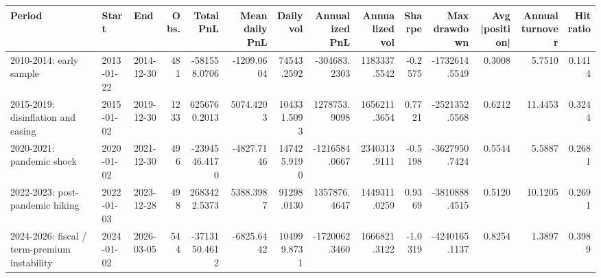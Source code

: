 \begin{tabular}{lllrrrrrrrrrrr}
\toprule
Period & Start & End & Obs. & Total PnL & Mean daily PnL & Daily vol & Annualized PnL & Annualized vol & Sharpe & Max drawdown & Avg |position| & Annual turnover & Hit ratio \\
\midrule
2010-2014: early sample & 2013-01-22 & 2014-12-30 & 481 & -581558.0706 & -1209.0604 & 74543.2592 & -304683.2303 & 1183337.5542 & -0.2575 & -1732614.5549 & 0.3008 & 5.7510 & 0.1414 \\
2015-2019: disinflation and easing & 2015-01-02 & 2019-12-30 & 1233 & 6256760.2013 & 5074.4203 & 104331.5093 & 1278753.9098 & 1656211.3654 & 0.7721 & -2521352.5568 & 0.6212 & 11.4453 & 0.3244 \\
2020-2021: pandemic shock & 2020-01-02 & 2021-12-30 & 496 & -2394546.4170 & -4827.7146 & 147425.9190 & -1216584.0667 & 2340313.9111 & -0.5198 & -3627950.7424 & 0.5544 & 5.5887 & 0.2681 \\
2022-2023: post-pandemic hiking & 2022-01-03 & 2023-12-28 & 498 & 2683422.5373 & 5388.3987 & 91298.0130 & 1357876.4647 & 1449311.0259 & 0.9369 & -3810888.4515 & 0.5120 & 10.1205 & 0.2691 \\
2024-2026: fiscal / term-premium instability & 2024-01-02 & 2026-03-05 & 544 & -3713150.4612 & -6825.6442 & 104999.8731 & -1720062.3460 & 1666821.3122 & -1.0319 & -4240165.1137 & 0.8254 & 1.3897 & 0.3989 \\
\bottomrule
\end{tabular}

